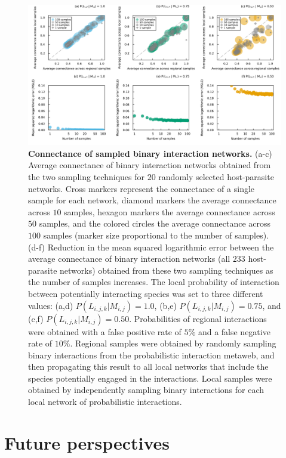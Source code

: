 \begin{figure}[!h]
  \centering
  \includegraphics[width=\textwidth]{figures/article1/network_sampling.png}
  \caption{\textbf{Connectance of sampled binary interaction networks.}
  (a-c) Average connectance of binary interaction networks obtained from the two
  sampling techniques for $20$ randomly selected host-parasite networks. Cross
  markers represent the connectance of a single sample for each network, diamond
  markers the average connectance across $10$ samples, hexagon markers the
  average connectance across $50$ samples, and the colored circles the average
  connectance across $100$ samples (marker size proportional to the number of
  samples). (d-f) Reduction in the mean squared logarithmic error between the
  average connectance of binary interaction networks (all $233$ host-parasite
  networks) obtained from these two sampling techniques as the number of samples
  increases. The local probability of interaction between potentially
  interacting species was set to three different values: (a,d) $P(L_{i, j,
  k}|M_{i, j}) = 1.0$, (b,e) $P(L_{i, j, k}|M_{i, j}) = 0.75$, and (c,f)
  $P(L_{i, j, k}|M_{i, j}) = 0.50$. Probabilities of regional interactions were
  obtained with a false positive rate of $5\%$ and a false negative rate of
  $10\%$. Regional samples were obtained by randomly sampling binary
  interactions from the probabilistic interaction metaweb, and then propagating
  this result to all local networks that include the species potentially engaged
  in the interactions. Local samples were obtained by independently sampling
  binary interactions for each local network of probabilistic interactions.}
  \label{fig:sampling}
\end{figure}

\clearpage

\section{Future perspectives}

